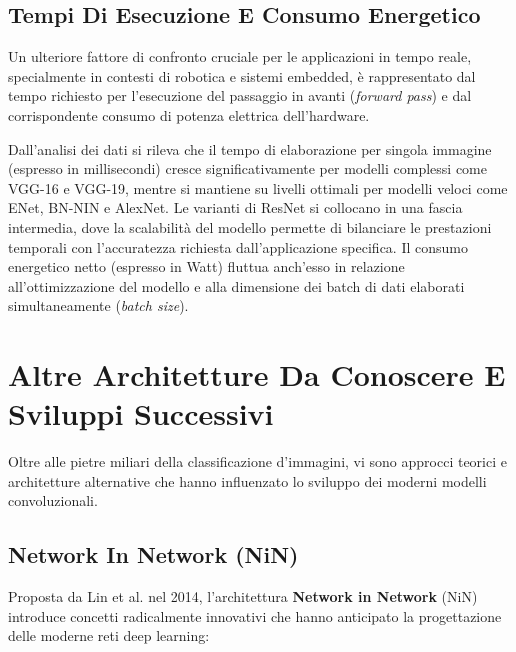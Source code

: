 ﻿\documentclass[11pt, a4paper]{article}
\begin{document}
\subsection{Tempi Di Esecuzione E Consumo Energetico}

Un ulteriore fattore di confronto cruciale per le applicazioni in tempo reale, specialmente in contesti di robotica e sistemi embedded, è rappresentato dal tempo richiesto per l'esecuzione del passaggio in avanti (\emph{forward pass}) e dal corrispondente consumo di potenza elettrica dell'hardware.


Dall'analisi dei dati si rileva che il tempo di elaborazione per singola immagine (espresso in millisecondi) cresce significativamente per modelli complessi come VGG-16 e VGG-19, mentre si mantiene su livelli ottimali per modelli veloci come ENet, BN-NIN e AlexNet. Le varianti di ResNet si collocano in una fascia intermedia, dove la scalabilità del modello permette di bilanciare le prestazioni temporali con l'accuratezza richiesta dall'applicazione specifica. Il consumo energetico netto (espresso in Watt) fluttua anch'esso in relazione all'ottimizzazione del modello e alla dimensione dei batch di dati elaborati simultaneamente (\emph{batch size}).

\newpage

\section{Altre Architetture Da Conoscere E Sviluppi Successivi}

Oltre alle pietre miliari della classificazione d'immagini, vi sono approcci teorici e architetture alternative che hanno influenzato lo sviluppo dei moderni modelli convoluzionali.


\subsection{Network In Network (NiN)}

Proposta da Lin et al. nel 2014, l'architettura \textbf{Network in Network} (NiN) introduce concetti radicalmente innovativi che hanno anticipato la progettazione delle moderne reti deep learning:
\end{document}
